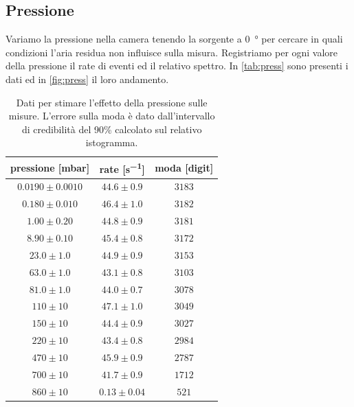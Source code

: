 \subsection{Pressione}

Variamo la pressione nella camera tenendo la sorgente a \SI{0}{\degree} per cercare in quali condizioni l'aria residua non influisce sulla misura.
Registriamo per ogni valore della pressione il rate di eventi ed il relativo spettro. In \autoref{tab:press} sono presenti i dati ed in \autoref{fig:press} il loro andamento.



\begin{table}[h]
\centering
\begin{tabular}{|c|c|c|}
\hline
pressione [mbar] & rate [\si{s^{-1}}] & moda [digit] \\
\hline
$ 0.0190 \pm 0.0010 $ & $ 44.6 \pm 0.9 $ & $ 3183 $ \\ 
$ 0.180 \pm 0.010 $ & $ 46.4 \pm 1.0 $ & $ 3182 $ \\ 
$ 1.00 \pm 0.20 $ & $ 44.8 \pm 0.9 $ & $ 3181 $ \\ 
$ 8.90 \pm 0.10 $ & $ 45.4 \pm 0.8 $ & $ 3172 $ \\ 
$ 23.0 \pm 1.0 $ & $ 44.9 \pm 0.9 $ & $ 3153 $ \\ 
$ 63.0 \pm 1.0 $ & $ 43.1 \pm 0.8 $ & $ 3103 $ \\ 
$ 81.0 \pm 1.0 $ & $ 44.0 \pm 0.7 $ & $ 3078 $ \\ 
$ 110 \pm 10 $ & $ 47.1 \pm 1.0 $ & $ 3049 $ \\ 
$ 150 \pm 10 $ & $ 44.4 \pm 0.9 $ & $ 3027 $ \\ 
$ 220 \pm 10 $ & $ 43.4 \pm 0.8 $ & $ 2984 $ \\ 
$ 470 \pm 10 $ & $ 45.9 \pm 0.9 $ & $ 2787 $ \\ 
$ 700 \pm 10 $ & $ 41.7 \pm 0.9 $ & $ 1712 $ \\ 
$ 860 \pm 10 $ & $ 0.13 \pm 0.04 $ & $ 521 $ \\ 
\hline
\end{tabular}
\caption{Dati per stimare l'effetto della pressione sulle misure. L'errore sulla moda è dato dall'intervallo di credibilità del 90\% calcolato sul relativo istogramma.}
\label{tab:press}
\end{table}


